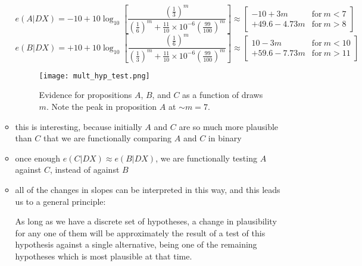 \documentclass[../jaynes_prob_theory_notes.tex]{subfiles}
\begin{document}
\begin{itemize}
\begin{itemize}
                    \begin{equation*}
                        e(A|DX) = -10 + 10\log_{10} \left[ \frac{{\left( \frac{1}{3} \right)}^m}{{\left( \frac{1}{6} \right)}^m + \frac{11}{10} \times 10^{-6} {\left( \frac{99}{100} \right)}^m} \right] \approx \left[ \begin{matrix} -10+3m & \mathrm{for}~m<7 \\ +49.6-4.73m & \mathrm{for}~m>8 \end{matrix} \right]
                    \end{equation*}
                    \begin{equation*}
                        e(B|DX) = +10 + 10\log_{10} \left[ \frac{{\left( \frac{1}{6} \right)}^m}{{\left( \frac{1}{3} \right)}^m + \frac{11}{10} \times 10^{-6} {\left( \frac{99}{100} \right)}^m} \right] \approx \left[ \begin{matrix} 10-3m & \mathrm{for}~m<10 \\ +59.6-7.73m & \mathrm{for}~m>11 \end{matrix} \right]
                    \end{equation*}
                    \begin{figure}
                        \centering
                        \texttt{[image: mult\_hyp\_test.png]}
                        \caption{Evidence for propositions $A$, $B$, and $C$ as a function of draws $m$. Note the peak in proposition $A$ at $\sim m = 7$.}
                    \end{figure}
                \item this is interesting, because initially $A$ and $C$ are so much more plausible than $C$ that we are functionally comparing $A$ and $C$ in binary
                \item once enough $e(C|DX) \approx e(B|DX)$, we are functionally testing $A$ against $C$, instead of against $B$
                \item all of the changes in slopes can be interpreted in this way, and this leads us to a general principle: 
                    \begin{displayquote}
                        As long as we have a discrete set of hypotheses, a change in plausibility for any one of them will be approximately the result of a test of this hypothesis against a single alternative, being one of the remaining hypotheses which is most plausible at that time.
                    \end{displayquote}
            \end{itemize}
    \end{itemize}
\end{document}
